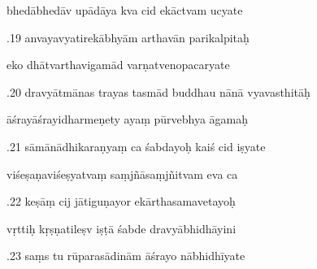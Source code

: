 \documentclass[article,12pt,a4paper]{memoir}%
\newcounter{parCount}
\begin{document}
	  
	  \pstart \leavevmode%
	bhedābhedāv upādāya kva cid ekāctvam ucyate 
	{}
	\pend%
      

	  
	  \pstart {}.19 anvayavyatirekābhyām arthavān parikalpitaḥ 
	{}
	\pend%
      

	  
	  \pstart \leavevmode%
	eko dhātvarthavigamād varṇatvenopacaryate 
	{}
	\pend%
      

	  
	  \pstart {}.20 dravyātmānas trayas tasmād buddhau nānā vyavasthitāḥ 
	{}
	\pend%
      

	  
	  \pstart \leavevmode%
	āśrayāśrayidharmeṇety ayaṃ pūrvebhya āgamaḥ 
	{}
	\pend%
      

	  
	  \pstart {}.21 sāmānādhikaraṇyaṃ ca śabdayoḥ kaiś cid iṣyate 
	{}
	\pend%
      

	  
	  \pstart \leavevmode%
	viśeṣaṇaviśeṣyatvaṃ saṃjñāsaṃjñitvam eva ca 
	{}
	\pend%
      

	  
	  \pstart {}.22 keṣāṃ cij jātiguṇayor ekārthasamavetayoḥ 
	{}
	\pend%
      

	  
	  \pstart \leavevmode%
	vṛttiḥ kṛṣṇatileṣv iṣṭā śabde dravyābhidhāyini 
	{}
	\pend%
      

	  
	  \pstart {}.23 saṃs tu rūparasādinām āśrayo nābhidhīyate 
	{}
	\pend%
      
\end{document}
